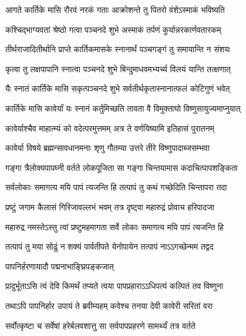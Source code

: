 \twolineshloka
{आगते कार्तिके मासि रौरवं नरकं गताः}
{आक्रोशन्ते तु पितरो वंशेऽस्माकं भविष्यति} %

\twolineshloka
{कश्चिद्भाग्यवतां श्रेष्ठो गत्वा पञ्चनदे शुभे}
{अस्माकं तर्पणं कुर्यान्नरकार्णवतारकम्} %

\twolineshloka
{तीर्थराजादितीर्थानि प्राप्ते कार्तिकमासके}
{स्नानार्थं पञ्चगङ्गं तु समायान्ति न संशयः} %

\twolineshloka
{कृत्वा तु लक्षपापानि स्नात्वा पञ्चनदे शुभे}
{बिन्दुमाधवमभ्यर्च्य विलयं यान्ति तत्क्षणात्} %

\twolineshloka
{यैः स्नातं कार्तिके मासि सकृत्पञ्चनदे शुभे}
{सर्वतीर्थकृतास्नानात्फलं कोटिगुणं भवेत्} %


\twolineshloka
{कार्तिके मासि कावेर्यां यः स्नानं कर्तुमिच्छति}
{तावता वै विमुक्ताघो विष्णुसायुज्यमाप्नुयात्} %

\twolineshloka
{कावेर्याश्चैव माहात्म्यं को वदेत्परमुत्तमम्}
{अत्र ते वर्णयिष्यामि इतिहासं पुरातनम्} %

\twolineshloka
{कावेर्या विषये ब्रह्मन्सावधानमनाः शृणु}
{गौतम्या उत्तरे तीरे विष्णुपादाब्जसम्भवा} %

\twolineshloka
{गङ्गा त्रैलोक्यपापघ्नी वर्तते लोकपूजिता}
{सा गङ्गा चिन्तयामास कदाचित्पापशङ्किता} %

\twolineshloka
{सर्वलोकाः समागत्य मयि पापं त्यजन्ति हि}
{तत्पापं तु कथं गच्छेदिति चिन्तापरा तदा} %

\twolineshloka
{प्रष्टुं जगाम कैलासं गिरिजावल्लभं भवम्}
{तत्र दृष्ट्वा महारुद्रं प्रोवाच हरिपादजा} %


\twolineshloka
{महारुद्र नमस्तेऽस्तु त्वां प्रष्टुमहमागता}
{सर्वे लोकाः समागत्य मयि पापं त्यजन्ति हि} %

\twolineshloka
{तत्पापं तु मया सोढुं न शक्यं पार्वतीपते}
{येनोपायेन तत्पापं नाऽऽगच्छेन्मम तद्वद} %




\onelineshloka
{पापनिर्हरणायादौ पद्मनाभाङ्घ्रिपङ्कजात्} %

\twolineshloka
{प्रादुर्भूताऽसि त्वं देवि किमर्थं तप्यते त्वया}
{पापप्रहाराऽऽधिपत्यं कल्पितं तव विष्णुना} %

\twolineshloka
{तथाऽपि पापनिर्हार उपायं ते ब्रवीम्यहम्}
{कवेश्च तनया देवी कावेरी सरितां वरा} %

\twolineshloka
{सर्वोत्कृष्टा च सर्वेषां हरेर्बलवशात्तु सा}
{सर्वपापप्रहरणे सामर्थ्यं तत्र वर्तते} %


